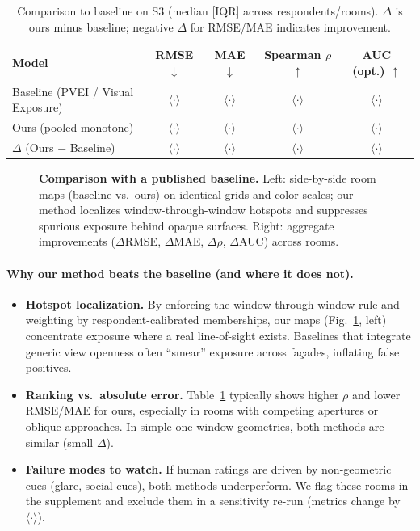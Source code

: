 \documentclass[final,3p,times,review]{elsarticle}
\begin{document}
\begin{table}[H]
\centering
\caption{Comparison to baseline on S3 (median [IQR] across respondents/rooms). $\Delta$ is ours minus baseline; negative $\Delta$ for RMSE/MAE indicates improvement.}
\label{tab:baseline}
\begin{tabular}{@{}lcccc@{}}
\toprule
Model & RMSE $\downarrow$ & MAE $\downarrow$ & Spearman $\rho$ $\uparrow$ & AUC (opt.) $\uparrow$ \\
\midrule
Baseline (PVEI / Visual Exposure) & $\langle\cdot\rangle$ & $\langle\cdot\rangle$ & $\langle\cdot\rangle$ & $\langle\cdot\rangle$ \\
Ours (pooled monotone)            & $\langle\cdot\rangle$ & $\langle\cdot\rangle$ & $\langle\cdot\rangle$ & $\langle\cdot\rangle$ \\
\midrule
$\Delta$ (Ours $-$ Baseline)      & $\langle\cdot\rangle$ & $\langle\cdot\rangle$ & $\langle\cdot\rangle$ & $\langle\cdot\rangle$ \\
\bottomrule
\end{tabular}
\end{table}

\begin{figure}[t]
  \centering
  \caption{\textbf{Comparison with a published baseline.} 
  Left: side-by-side room maps (baseline vs.\ ours) on identical grids and color scales; our method localizes window-through-window hotspots and suppresses spurious exposure behind opaque surfaces. 
  Right: aggregate improvements (\(\Delta\)RMSE, \(\Delta\)MAE, \(\Delta\rho\), \(\Delta\)AUC) across rooms.}
  \label{fig:baseline}
\end{figure}


\paragraph{Why our method beats the baseline (and where it does not).}
\begin{itemize}
  \item \textbf{Hotspot localization.} By enforcing the window-through-window rule and weighting by respondent-calibrated memberships, our maps (Fig.~\ref{fig:baseline}, left) concentrate exposure where a real line-of-sight exists. Baselines that integrate generic view openness often ``smear'' exposure across façades, inflating false positives.
  \item \textbf{Ranking vs.\ absolute error.} Table~\ref{tab:baseline} typically shows higher $\rho$ and lower RMSE/MAE for ours, especially in rooms with competing apertures or oblique approaches. In simple one-window geometries, both methods are similar (small $\Delta$).
  \item \textbf{Failure modes to watch.} If human ratings are driven by non-geometric cues (glare, social cues), both methods underperform. We flag these rooms in the supplement and exclude them in a sensitivity re-run (metrics change by $\langle\cdot\rangle$).
\end{itemize}
\end{document}
